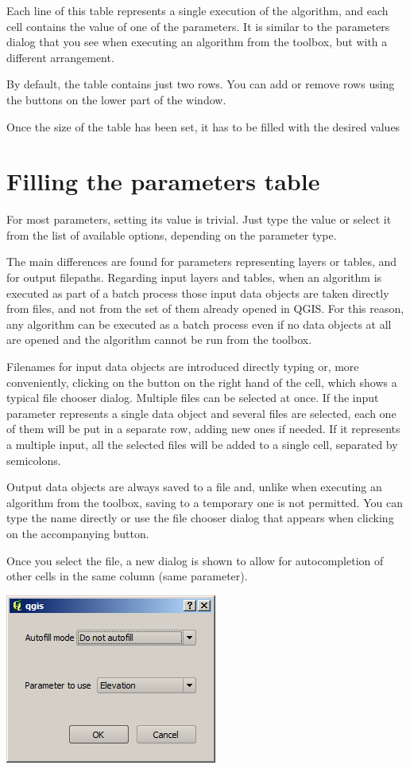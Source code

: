 Each line of this table represents a single execution of the algorithm, and each cell contains the value of one of the parameters. It is similar to the parameters dialog that you see when executing an algorithm from the toolbox, but with a different arrangement.

By default, the table contains just two rows. You can add or remove rows using the buttons on the lower part of the window.

Once the size of the table has been set, it has to be filled with the desired values

\section{Filling the parameters table}

For most parameters, setting its value is trivial. Just type the value or select it from the list of available options, depending on the parameter type. 

The main differences are found for parameters representing layers or tables, and for output filepaths. Regarding input layers and tables, when an algorithm is executed  as part of a batch process those input data objects are taken directly from files, and not from the set of them already opened in QGIS. For this reason, any algorithm can be executed as a batch process even if no data objects at all are opened and the algorithm cannot be run from the toolbox.

Filenames for input data objects are introduced directly typing or, more conveniently, clicking on the button on the right hand of the cell, which shows a typical file chooser dialog. Multiple files can be selected at once. If the input parameter represents a single data object and several files are selected, each one of them will be put in a separate row, adding new ones if needed. If it represents a multiple input, all the selected files will be added to a single cell, separated by semicolons.

Output data objects are always saved to a file and, unlike when executing an algorithm from the toolbox, saving to a temporary one is not permitted. You can type the name directly or use the file chooser dialog that appears when clicking on the accompanying button. 


Once you select the file, a new dialog is shown to allow for autocompletion of other cells in the same column (same parameter).
 
\begin{center}
\includegraphics[width=.45\columnwidth]{batch_processing_save.png}
\end{center} 
 
